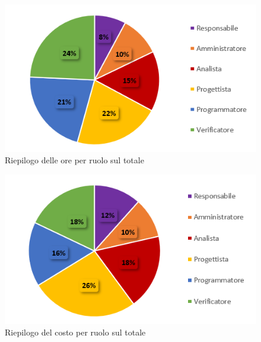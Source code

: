 \begin{figure}[H]
  \centering
  \includegraphics[scale=0.9]{immagini/ore_ruolo_riepilogo.png}
  \caption{Riepilogo delle ore per ruolo sul totale}
\end{figure}

\begin{figure}[H]
  \centering
  \includegraphics[scale=0.9]{immagini/costo_ruolo_riepilogo.png}
  \caption{Riepilogo del costo per ruolo sul totale}
\end{figure}

